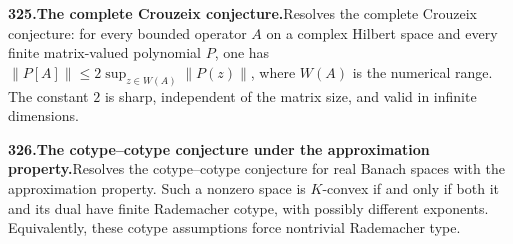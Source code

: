 \documentclass[11pt,a4paper]{article}
\begin{document}
  \par \begin{minipage}{\linewidth}
  \fontsize{10.5}{12.6}\selectfont\RaggedRight
  \hypertarget{result 325}{}
  {\bfseries\textcolor{muted}{325.}\enspace The complete Crouzeix conjecture.}\enspace Resolves the complete Crouzeix conjecture: for every bounded operator $A$ on a complex Hilbert space and every finite matrix-valued polynomial $P$, one has $\lVert P[A]\rVert\le2\sup_{z\in W(A)}\lVert P(z)\rVert$, where $W(A)$ is the numerical range. The constant $2$ is sharp, independent of the matrix size, and valid in infinite dimensions.\par
  \end{minipage}\par\vspace{5pt}



  \par \begin{minipage}{\linewidth}
  \fontsize{10.5}{12.6}\selectfont\RaggedRight
  \hypertarget{result 326}{}
  {\bfseries\textcolor{muted}{326.}\enspace The cotype--cotype conjecture under the approximation property.}\enspace Resolves the cotype--cotype conjecture for real Banach spaces with the approximation property. Such a nonzero space is $K$-convex if and only if both it and its dual have finite Rademacher cotype, with possibly different exponents. Equivalently, these cotype assumptions force nontrivial Rademacher type.\par
  \end{minipage}\par\vspace{5pt}
\end{document}
